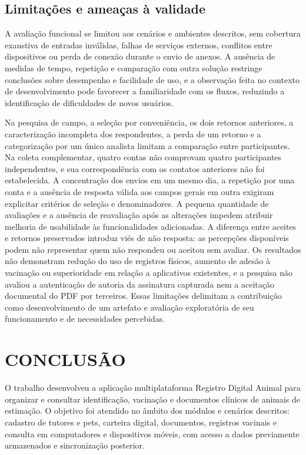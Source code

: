 \documentclass{UNESC}
\begin{document}
\subsection{Limitações e ameaças à validade}

A avaliação funcional se limitou aos cenários e ambientes descritos, sem cobertura exaustiva de entradas inválidas, falhas de serviços externos, conflitos entre dispositivos ou perda de conexão durante o envio de anexos. A ausência de medidas de tempo, repetição e comparação com outra solução restringe conclusões sobre desempenho e facilidade de uso, e a observação feita no contexto de desenvolvimento pode favorecer a familiaridade com os fluxos, reduzindo a identificação de dificuldades de novos usuários.

Na pesquisa de campo, a seleção por conveniência, os dois retornos anteriores, a caracterização incompleta dos respondentes, a perda de um retorno e a categorização por um único analista limitam a comparação entre participantes. Na coleta complementar, quatro contas não comprovam quatro participantes independentes, e sua correspondência com os contatos anteriores não foi estabelecida. A concentração dos envios em um mesmo dia, a repetição por uma conta e a ausência de resposta válida aos campos gerais em outra exigiram explicitar critérios de seleção e denominadores. A pequena quantidade de avaliações e a ausência de reavaliação após as alterações impedem atribuir melhoria de usabilidade às funcionalidades adicionadas. A diferença entre aceites e retornos preservados introduz viés de não resposta: as percepções disponíveis podem não representar quem não respondeu ou aceitou sem avaliar. Os resultados não demonstram redução do uso de registros físicos, aumento de adesão à vacinação ou superioridade em relação a aplicativos existentes, e a pesquisa não avaliou a autenticação de autoria da assinatura capturada nem a aceitação documental do PDF por terceiros. Essas limitações delimitam a contribuição como desenvolvimento de um artefato e avaliação exploratória de seu funcionamento e de necessidades percebidas.

\section{CONCLUSÃO}

O trabalho desenvolveu a aplicação multiplataforma Registro Digital Animal para organizar e consultar identificação, vacinação e documentos clínicos de animais de estimação. O objetivo foi atendido no âmbito dos módulos e cenários descritos: cadastro de tutores e pets, carteira digital, documentos, registros vacinais e consulta em computadores e dispositivos móveis, com acesso a dados previamente armazenados e sincronização posterior.
\end{document}
